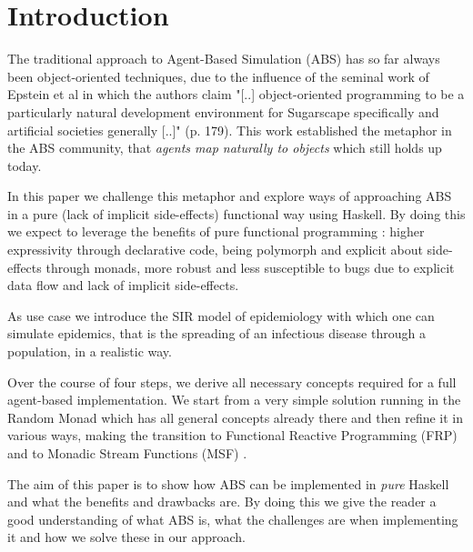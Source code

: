 \section{Introduction}
The traditional approach to Agent-Based Simulation (ABS) has so far always been object-oriented techniques, due to the influence of the seminal work of Epstein et al \cite{epstein_growing_1996} in which the authors claim "[..] object-oriented programming to be a particularly natural development environment for Sugarscape specifically and artificial societies generally [..]" (p. 179). This work established the metaphor in the ABS community, that \textit{agents map naturally to objects} \cite{north_managing_2007} which still holds up today.

In this paper we challenge this metaphor and explore ways of approaching ABS in a pure (lack of implicit side-effects) functional way using Haskell. By doing this we expect to leverage the benefits of pure functional programming \cite{hudak_history_2007}: higher expressivity through declarative code, being polymorph and explicit about side-effects through monads, more robust and less susceptible to bugs due to explicit data flow and lack of implicit side-effects.

As use case we introduce the SIR model of epidemiology with which one can simulate epidemics, that is the spreading of an infectious disease through a population, in a realistic way.

Over the course of four steps, we derive all necessary concepts required for a full agent-based implementation. We start from a very simple solution running in the Random Monad which has all general concepts already there and then refine it in various ways, making the transition to Functional Reactive Programming (FRP) \cite{wan_functional_2000} and to Monadic Stream Functions (MSF) \cite{perez_functional_2016}.

The aim of this paper is to show how ABS can be implemented in \textit{pure} Haskell and what the benefits and drawbacks are. By doing this we give the reader a good understanding of what ABS is, what the challenges are when implementing it and how we solve these in our approach.

